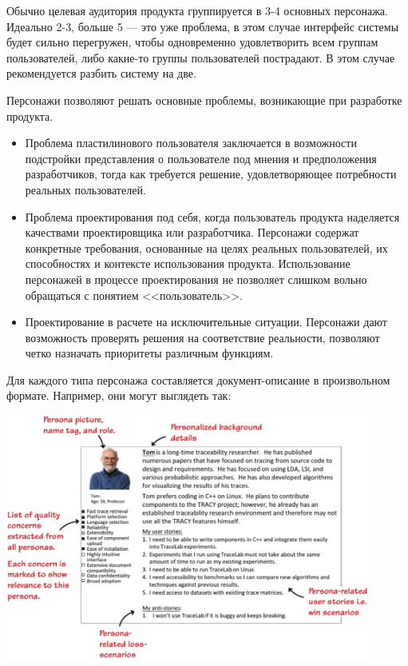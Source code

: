 \documentclass{../../text-style}
\begin{document}
Обычно целевая аудитория продукта группируется в 3-4 основных персонажа. Идеально 2-3, больше 5 --- это уже проблема, в этом случае интерфейс системы будет сильно перегружен, чтобы одновременно удовлетворить всем группам пользователей, либо какие-то группы пользователей пострадают. В этом случае рекомендуется разбить систему на две.

Персонажи позволяют решать основные проблемы, возникающие при разработке продукта.

\begin{itemize}
    \item Проблема пластилинового пользователя заключается в возможности подстройки представления о пользователе под мнения и предположения разработчиков, тогда как требуется решение, удовлетворяющее потребности реальных пользователей.
    \item Проблема проектирования под себя, когда пользователь продукта наделяется качествами проектировщика или разработчика. Персонажи содержат конкретные требования, основанные на целях реальных пользователей, их способностях и контексте использования продукта. Использование персонажей в процессе проектирования не позволяет слишком вольно обращаться с понятием <<пользователь>>.
    \item Проектирование в расчете на исключительные ситуации. Персонажи дают возможность проверять решения на соответствие реальности, позволяют четко назначать приоритеты различным функциям.
\end{itemize}

Для каждого типа персонажа составляется документ-описание в произвольном формате. Например, они могут выглядеть так:

\begin{center}
    \includegraphics[width=0.9\textwidth]{tom.png}
\end{center}
\end{document}
